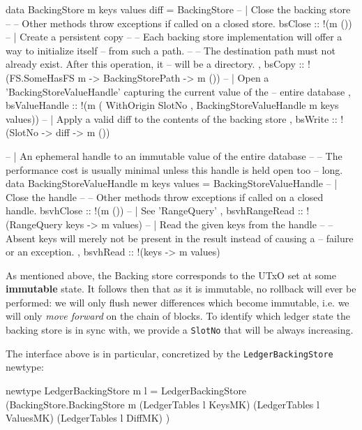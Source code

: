 \documentclass[11pt,a4paper]{article}
\newcommand{\htt}[1]{\texttt{#1}}
\theoremstyle{definition}
\begin{document}
\begin{code}
data BackingStore m keys values diff = BackingStore {
    -- | Close the backing store
    --
    -- Other methods throw exceptions if called on a closed store.
    bsClose       :: !(m ())
    -- | Create a persistent copy
    --
    -- Each backing store implementation will offer a way to initialize itself
    -- from such a path.
    --
    -- The destination path must not already exist. After this operation, it
    -- will be a directory.
  , bsCopy        :: !(FS.SomeHasFS m -> BackingStorePath -> m ())
    -- | Open a 'BackingStoreValueHandle' capturing the current value of the
    -- entire database
  , bsValueHandle :: !(m ( WithOrigin SlotNo
                         , BackingStoreValueHandle m keys values))
    -- | Apply a valid diff to the contents of the backing store
  , bsWrite       :: !(SlotNo -> diff -> m ())
}

-- | An ephemeral handle to an immutable value of the entire database
--
-- The performance cost is usually minimal unless this handle is held open too
-- long.
data BackingStoreValueHandle m keys values = BackingStoreValueHandle {
    -- | Close the handle
    --
    -- Other methods throw exceptions if called on a closed handle.
    bsvhClose     :: !(m ())
    -- | See 'RangeQuery'
  , bsvhRangeRead :: !(RangeQuery keys -> m values)
    -- | Read the given keys from the handle
    --
    -- Absent keys will merely not be present in the result instead of causing a
    -- failure or an exception.
  , bsvhRead      :: !(keys -> m values)
  }
\end{code}

As mentioned above, the Backing store corresponds to the UTxO set at some {\bf
  immutable} state. It follows then that as it is immutable, no rollback will
ever be performed: we will only flush newer differences which become immutable,
i.e. we will only \emph{move forward} on the chain of blocks. To identify which
ledger state the backing store is in sync with, we provide a \htt{SlotNo} that
will be always increasing.

The interface above is in particular, concretized by the \htt{LedgerBackingStore} newtype:

\begin{code}
newtype LedgerBackingStore m l = LedgerBackingStore
    (BackingStore.BackingStore m
      (LedgerTables l KeysMK)
      (LedgerTables l ValuesMK)
      (LedgerTables l DiffMK)
    )
\end{code}
\end{document}
